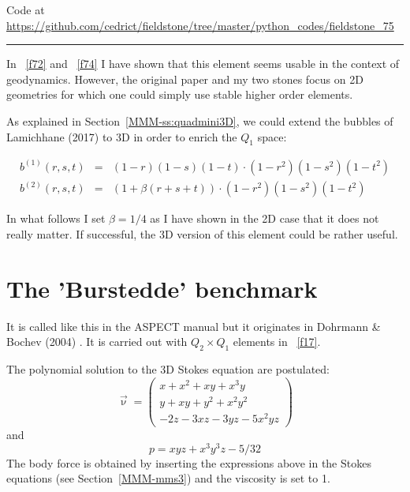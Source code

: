 

\begin{center}
Code at \url{https://github.com/cedrict/fieldstone/tree/master/python_codes/fieldstone_75}
\end{center}

\par\noindent\rule{\textwidth}{0.4pt}


In \stone~\ref{f72} and \stone~\ref{f74} I have shown that this element
seems usable in the context of geodynamics. However, the original paper 
and my two stones focus on 2D geometries for which one could simply use 
stable higher order elements.

As explained in Section~\ref{MMM-ss:quadmini3D}, we could extend the bubbles 
of Lamichhane (2017) \cite{lami17} to 3D in order to enrich the $Q_1$ space:

\begin{eqnarray}
b^{(1)} (r,s,t) &=& (1-r)(1-s)(1-t) \cdot (1-r^2) (1-s^2) (1-t^2) \\
b^{(2)} (r,s,t) &=& (1 + \beta(r+s+t)) \cdot (1-r^2) (1-s^2) (1-t^2) 
\end{eqnarray}

In what follows I set $\beta=1/4$ as I have shown in the 2D case that it does not really matter. 
If successful, the 3D version of this element could be rather useful.

\section*{The 'Burstedde' benchmark} It is called like this in the ASPECT manual 
but it originates in Dohrmann \& Bochev (2004) \cite{dobo04}. It is carried 
out with $Q_2 \times Q_1$ elements in \stone~\ref{f17}. 

The polynomial solution to the 3D Stokes equation are postulated:
\begin{equation}
\vec{\upnu}
=
\left(
\begin{array}{c}
x+x^2+xy+x^3y \\
y + xy + y^2 + x^2 y^2\\
-2z - 3xz - 3yz - 5x^2 yz
\end{array}
\right)
\end{equation}
and
\begin{equation}
p = xyz + x^3 y^3z - 5/32
\end{equation}
The body force is obtained by inserting the expressions above in the Stokes equations
(see Section~\ref{MMM-mms3}) and the viscosity is set to 1.

